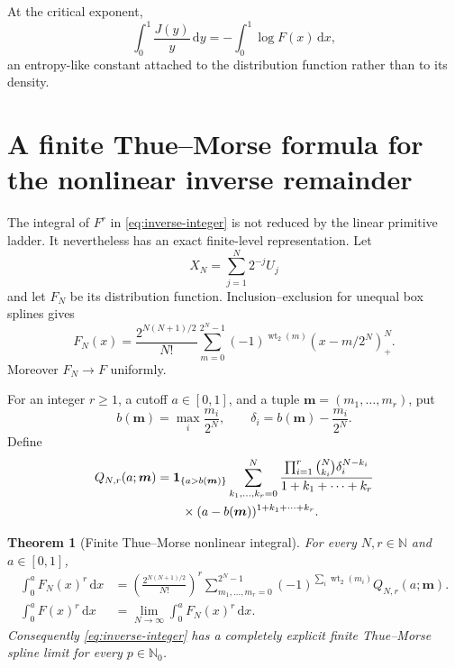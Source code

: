 \documentclass[11pt,oneside]{article}
\numberwithin{equation}{section}
\newtheorem{theorem}{Theorem}[section]
\theoremstyle{definition}
\theoremstyle{remark}
\newcommand{\N}{\mathbb N}
\newcommand{\InvF}{J}
\newcommand{\dd}{\,\mathrm d}
\newcommand{\wt}{\operatorname{wt}_2}
\newcommand{\pospart}[1]{\left(#1\right)_{+}}
\begin{document}
At the critical exponent,
\begin{equation}
 \int_0^1\frac{\InvF(y)}y\dd y=-\int_0^1\log F(x)\dd x,   \label{eq:inverse-log-constant}
\end{equation}
an entropy-like constant attached to the distribution function rather than to
its density.

\section{A finite Thue--Morse formula for the nonlinear inverse remainder}
\label{sec:nonlinear-spline}

The integral of $F^r$ in \eqref{eq:inverse-integer} is not reduced by the linear
primitive ladder.  It nevertheless has an exact finite-level representation.
Let
\begin{equation}
 X_N=\sum_{j=1}^{N}2^{-j}U_j
\end{equation}
and let $F_N$ be its distribution function.  Inclusion--exclusion for unequal
box splines gives
\begin{equation}
 \boxed{
 F_N(x)=\frac{2^{N(N+1)/2}}{N!}
 \sum_{m=0}^{2^N-1}(-1)^{\wt(m)}
 \pospart{x-m/2^N}^{N}.}                                  \label{eq:finite-FN}
\end{equation}
Moreover $F_N\to F$ uniformly.

For an integer $r\ge1$, a cutoff $a\in[0,1]$, and a tuple
$\bm m=(m_1,\ldots,m_r)$, put
\begin{equation}
 b(\bm m)=\max_i\frac{m_i}{2^N},\qquad
 \delta_i=b(\bm m)-\frac{m_i}{2^N}.                       \label{eq:b-delta}
\end{equation}
Define
\begin{align}
 Q_{N,r}(a;\bm m)
 &=\mathbf 1_{\{a>b(\bm m)\}}
 \sum_{k_1,\ldots,k_r=0}^{N}
 \frac{\prod_{i=1}^{r}\binom N{k_i}\delta_i^{N-k_i}}
 {1+k_1+\cdots+k_r}                                       \notag\\
 &\qquad\times(a-b(\bm m))^{1+k_1+\cdots+k_r}.           \label{eq:Q-Nr}
\end{align}

\begin{theorem}[Finite Thue--Morse nonlinear integral]
\label{thm:finite-nonlinear}
For every $N,r\in\N$ and $a\in[0,1]$,
\begin{align}
 \int_0^aF_N(x)^r\dd x
 &=\left(\frac{2^{N(N+1)/2}}{N!}\right)^r
 \sum_{m_1,\ldots,m_r=0}^{2^N-1}
 (-1)^{\sum_i\wt(m_i)}Q_{N,r}(a;\bm m).                  \label{eq:finite-nonlinear}\\
 \int_0^aF(x)^r\dd x
 &=\lim_{N\to\infty}\int_0^aF_N(x)^r\dd x.              \label{eq:nonlinear-limit}
\end{align}
Consequently \eqref{eq:inverse-integer} has a completely explicit finite
Thue--Morse spline limit for every $p\in\N_0$.
\end{theorem}
\end{document}
